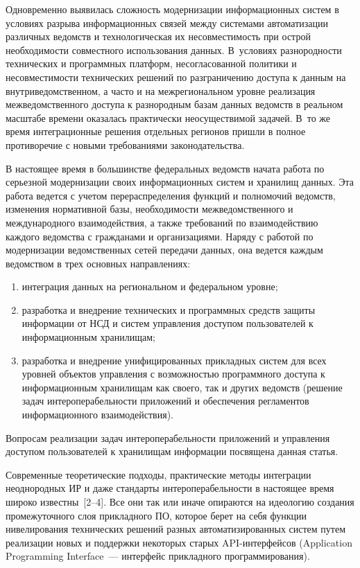 \begin{multicols}{2}
      Одновременно выявилась сложность модернизации информационных систем в 
условиях разрыва информационных связей между системами автоматизации различных 
ведомств и технологическая их несовместимость при острой не\-об\-хо\-ди\-мости совместного 
использования данных. В~условиях разнородности технических и программных платформ, 
несогласованной политики и не\-со\-вмес\-ти\-мости технических решений по разграничению 
доступа к данным на внутриведомственном, а часто и на межрегиональном уровне реализация 
межведомственного доступа к разнородным базам данных ведомств в реальном масштабе 
времени оказалась практически неосуществимой задачей. В~то же время интеграционные 
решения отдельных регионов пришли в полное противоречие с новыми требованиями 
законодательства.
      
      В настоящее время в большинстве федеральных ведомств начата работа по серьезной 
модернизации своих информационных систем и хранилищ данных. Эта работа ведется с 
учетом перераспределения функций и полномочий ведомств, изменения нормативной базы, 
необходимости межведомственного и международного взаимодействия, а также требований 
по взаимодействию каждого ведомства с гражданами и организациями. Наряду с работой по 
модернизации ведомственных сетей передачи данных, она ведется каждым ведомством в трех 
основных направлениях:
      \begin{enumerate}[(1)]
\item интеграция данных на региональном и федеральном уровне;
\item разработка и внедрение технических и программных средств защиты информации 
от НСД и систем управления доступом пользователей к информационным хранилищам;
\item разработка и внедрение унифицированных прикладных систем для всех уровней 
объектов управления с возможностью программного доступа к информационным 
хранилищам как своего, так и других ведомств (решение задач интероперабельности 
приложений и обеспечения регламентов информационного взаимодействия). 
\end{enumerate}

      Вопросам реализации задач интероперабель\-ности приложений и управления доступом 
пользователей к хранилищам информации посвящена данная статья.
      
       Современные теоретические подходы, практические методы интеграции 
неоднородных ИР и даже стандарты интероперабельности в 
настоящее время широко известны~[2--4]. Все они так или иначе опираются на идеологию 
создания промежуточного слоя прикладного ПО, которое берет на себя функции 
нивелирования технических решений разных автоматизированных систем путем реализации 
новых и поддержки некоторых старых API-ин\-тер\-фей\-сов (Application Programming Interface~--- интерфейс прикладного 
программирования).
      

\end{multicols}
